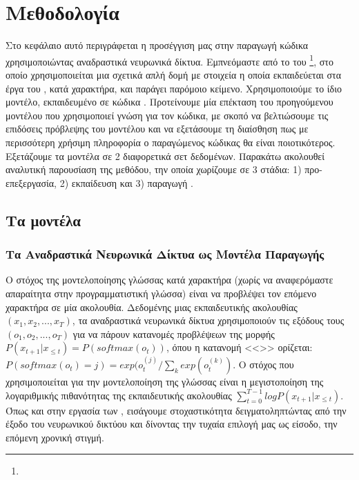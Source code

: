 \chapter{Μεθοδολογία}
Στο κεφάλαιο αυτό περιγράφεται η προσέγγιση μας στην παραγωγή κώδικα χρησιμοποιώντας αναδραστικά νευρωνικά δίκτυα.
Εμπνεόμαστε από το  του \footnote{}, στο οποίο χρησιμοποιείται μια σχετικά απλή δομή  με  στοιχεία η οποία εκπαιδεύεται στα έργα του , κατά χαρακτήρα, και παράγει παρόμοιο κείμενο.
Χρησιμοποιούμε το ίδιο μοντέλο, εκπαιδευμένο σε κώδικα .
Προτείνουμε μία επέκταση του προηγούμενου μοντέλου που χρησιμοποιεί  γνώση για τον κώδικα, με σκοπό να βελτιώσουμε τις επιδόσεις πρόβλεψης του μοντέλου και να εξετάσουμε τη διαίσθηση πως με περισσότερη χρήσιμη πληροφορία ο παραγώμενος κώδικας θα είναι ποιοτικότερος.
Εξετάζουμε τα μοντέλα σε 2 διαφορετικά σετ δεδομένων.
Παρακάτω ακολουθεί αναλυτική παρουσίαση της μεθόδου, την οποία χωρίζουμε σε 3 στάδια: 1) προ-επεξεργασία, 2) εκπαίδευση και 3) παραγωγή .

\section{Τα μοντέλα}

\subsection{Τα Αναδραστικά Νευρωνικά Δίκτυα ως Μοντέλα Παραγωγής}
Ο στόχος της μοντελοποίησης γλώσσας κατά χαρακτήρα (χωρίς να αναφερόμαστε απαραίτητα στην προγραμματιστική γλώσσα) είναι να προβλέψει τον επόμενο χαρακτήρα σε μία ακολουθία.
Δεδομένης μιας εκπαιδευτικής ακολουθίας $(x_1, x_2, ..., x_T)$, τα αναδραστικά νευρωνικά δίκτυα χρησιμοποιούν τις εξόδους τους $(ο_1, ο_2, ..., ο_T)$ για να πάρουν κατανομές προβλέψεων της μορφής $P(x_{t+1}|x_{\leq{t}}) = P(softmax(o_t))$, όπου η κατανομή <<>> ορίζεται: $P(softmax(o_t) = j) = exp(o_t^{(j)}/\sum_k exp(o_t^{(k)})$.
Ο στόχος που χρησιμοποιείται για την μοντελοποίηση της γλώσσας είναι η μεγιστοποίηση της λογαριθμικής πιθανότητας της εκπαιδευτικής ακολουθίας $\sum_{t=0}^{T-1}logP(x_{t+1}|x_{\leq{t}})$.
Όπως και στην εργασία των  \cite{Graves2013}, εισάγουμε στοχαστικότητα δειγματοληπτώντας από την έξοδο του νευρωνικού δικτύου και δίνοντας την τυχαία επιλογή μας ως είσοδο, την επόμενη χρονική στιγμή.

